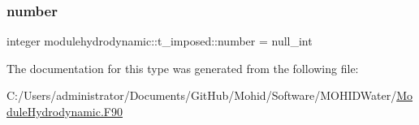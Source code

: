 \mbox{\label{structmodulehydrodynamic_1_1t__imposed_a95d59863d7ab1652b2e9e2547ca442d0}} 
\subsubsection{\texorpdfstring{number}{number}}
{\footnotesize\ttfamily integer modulehydrodynamic\+::t\+\_\+imposed\+::number = null\+\_\+int\hspace{0.3cm}{\ttfamily [private]}}



The documentation for this type was generated from the following file\+:\begin{DoxyCompactItemize}
\item 
C\+:/\+Users/administrator/\+Documents/\+Git\+Hub/\+Mohid/\+Software/\+M\+O\+H\+I\+D\+Water/\mbox{\hyperlink{_module_hydrodynamic_8_f90}{Module\+Hydrodynamic.\+F90}}\end{DoxyCompactItemize}
